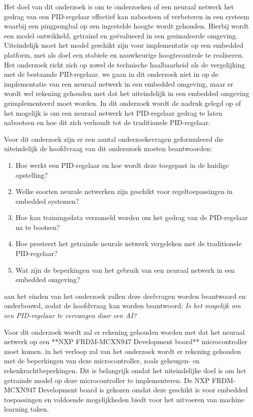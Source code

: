 Het doel van dit onderzoek is om te onderzoeken of een neuraal netwerk het gedrag van een PID-regelaar effectief kan nabootsen of verbeteren in een systeem waarbij een pingpongbal op een ingestelde hoogte wordt gehouden. Hierbij wordt een model ontwikkeld, getraind en geëvalueerd in een gesimuleerde omgeving. Uiteindelijk moet het model geschikt zijn voor implementatie op een embedded platform, met als doel een stabiele en nauwkeurige hoogtecontrole te realiseren. Het onderzoek richt zich op zowel de technische haalbaarheid als de vergelijking met de bestaande PID-regelaar. we gaan in dit onderzoek niet in op de implementatie van een neuraal netwerk in een embedded omgeving, maar er wordt wel rekening gehouden met dat het uiteindelijk in een embedded omgeving geimplementeerd moet worden. In dit onderzoek wordt de nadruk gelegd op of het mogelijk is om een neuraal netwerk het PID-regelaar gedrag te laten nabootsen en hoe dit zich verhoudt tot de traditionele PID-regelaar.

Voor dit onderzoek zijn er een aantal onderzoeksvragen geformuleerd die uiteindelijk de hoofdvraag van dit onderszoek moeten beantwoorden:
\begin{enumerate}
  \item Hoe werkt een PID-regelaar en hoe wordt deze toegepast in de huidige opstelling?
  \item Welke soorten neurale netwerken zijn geschikt voor regeltoepassingen in embedded systemen?
  \item Hoe kan trainingsdata verzameld worden om het gedrag van de PID-regelaar na te bootsen?
  \item Hoe presteert het getrainde neurale netwerk vergeleken met de traditionele PID-regelaar?
  \item Wat zijn de beperkingen van het gebruik van een neuraal netwerk in een embedded omgeving?
\end{enumerate}

aan het einden van het onderzoek zullen deze deelvragen worden beantwoord en onderbouwd, zodat de hoofdvraag kan worden beantwoord: \textit{Is het mogelijk om een PID-regelaar te vervangen door een AI?}

Voor dit onderzoek wordt zal er rekening gehouden worden met dat het neuraal netwerk op een **NXP FRDM-MCXN947 Development board** microcontroller moet komen. in het verloop zal van het onderzoek wordt er rekening gehouden met de beperkingen van deze microcontroller, zoals geheugen- en rekenkrachtbeperkingen. Dit is belangrijk omdat het uiteindelijke doel is om het getrainde model op deze microcontroller te implementeren. De NXP FRDM-MCXN947 Development board is gekozen omdat deze geschikt is voor embedded toepassingen en voldoende mogelijkheden biedt voor het uitvoeren van machine learning taken.




